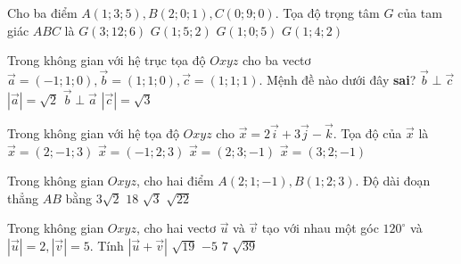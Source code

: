 \begin{ex}%
Cho ba điểm $A(1; 3; 5), B(2; 0; 1), C(0; 9; 0)$. Tọa độ trọng tâm $G$ của tam giác $ABC$ là
	\choice
		{$G(3; 12; 6)$}
		{$G(1; 5; 2)$}
		{$G(1; 0; 5)$}
		{\True $G(1; 4; 2)$}
\end{ex}
\begin{ex}%
Trong không gian với hệ trục tọa độ $Oxyz$ cho ba vectơ $\overrightarrow{a}=(-1; 1; 0), \overrightarrow{b}=(1; 1; 0), \overrightarrow{c}=(1; 1; 1)$. Mệnh đề nào dưới đây \textbf{sai}?
	\choice
		{\True $\overrightarrow{b} \perp \overrightarrow{c}$}
		{$|\overrightarrow{a}|=\sqrt{2}$}
		{$\overrightarrow{b} \perp \overrightarrow{a}$}
		{$|\overrightarrow{c}|=\sqrt{3}$}
\end{ex}
\begin{ex}%
Trong không gian với hệ tọa độ $Oxyz$ cho $\overrightarrow{x}=2\overrightarrow{i}+3\overrightarrow{j}-\overrightarrow{k}$. Tọa độ của $\overrightarrow{x}$ là
	\choice
		{$\overrightarrow{x}=(2;-1; 3)$}
		{$\overrightarrow{x}=(-1; 2; 3)$}
		{\True $\overrightarrow{x}=(2; 3;-1)$}
		{$\overrightarrow{x}=(3; 2;-1)$}
\end{ex}
\begin{ex}%
Trong không gian $Oxyz$, cho hai điểm $A(2; 1;-1), B(1; 2; 3)$. Độ dài đoạn thẳng $AB$ bằng
	\choice
		{\True $3\sqrt{2}$}
		{$18$}
		{$\sqrt{3}$}
		{$\sqrt{22}$}
\end{ex}
\begin{ex}%
Trong không gian $Oxyz$, cho hai vectơ $\overrightarrow{u}$ và $\overrightarrow{v}$ tạo với nhau một góc $120^{\circ}$ và $|\overrightarrow{u}|=2,|\overrightarrow{v}|=5$. Tính $|\overrightarrow{u}+\overrightarrow{v}|$ 
	\choice
		{\True $\sqrt{19}$}
		{$-5$}
		{$7$}
		{$\sqrt{39}$}
\end{ex}
